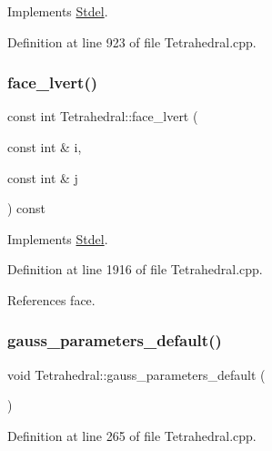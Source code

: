 Implements \hyperlink{classStdel_ae144597c3199b1757a5fbbc255e17baa}{Stdel}.



Definition at line 923 of file Tetrahedral.\+cpp.

\mbox{\label{classTetrahedral_a6d41f9bca28c634aad037ffaff071ed6}} 
\subsubsection{\texorpdfstring{face\+\_\+lvert()}{face\_lvert()}}
{\footnotesize\ttfamily const int Tetrahedral\+::face\+\_\+lvert (\begin{DoxyParamCaption}\item[{const int \&}]{i,  }\item[{const int \&}]{j }\end{DoxyParamCaption}) const\hspace{0.3cm}{\ttfamily [virtual]}}



Implements \hyperlink{classStdel_a0df3b2fe6d87c6d0067d07ac2a2d3a32}{Stdel}.



Definition at line 1916 of file Tetrahedral.\+cpp.



References face.

\mbox{\label{classTetrahedral_af21ac1b16603e912b6a9530475f42efa}} 
\subsubsection{\texorpdfstring{gauss\+\_\+parameters\+\_\+default()}{gauss\_parameters\_default()}}
{\footnotesize\ttfamily void Tetrahedral\+::gauss\+\_\+parameters\+\_\+default (\begin{DoxyParamCaption}{ }\end{DoxyParamCaption})\hspace{0.3cm}{\ttfamily [private]}}



Definition at line 265 of file Tetrahedral.\+cpp.



